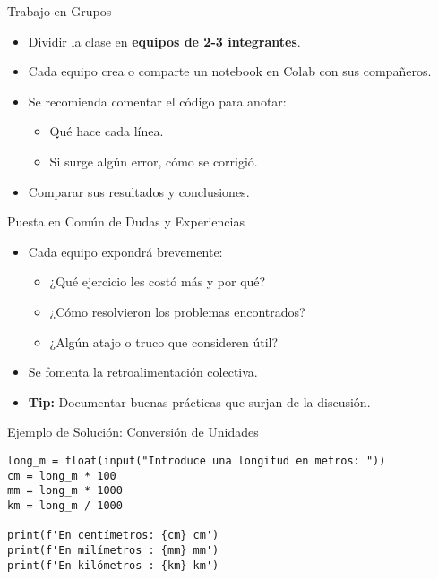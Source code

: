 \documentclass[10pt]{beamer}
\begin{document}
\begin{frame}{Trabajo en Grupos}
  \begin{itemize}
    \item Dividir la clase en \textbf{equipos de 2-3 integrantes}.
    \item Cada equipo crea o comparte un notebook en Colab con sus compañeros.
    \item Se recomienda comentar el código para anotar:
      \begin{itemize}
        \item Qué hace cada línea.
        \item Si surge algún error, cómo se corrigió.
      \end{itemize}
    \item Comparar sus resultados y conclusiones.
  \end{itemize}
\end{frame}

\begin{frame}{Puesta en Común de Dudas y Experiencias}
  \begin{itemize}
    \item Cada equipo expondrá brevemente:
      \begin{itemize}
        \item ¿Qué ejercicio les costó más y por qué?
        \item ¿Cómo resolvieron los problemas encontrados?
        \item ¿Algún atajo o truco que consideren útil?
      \end{itemize}
    \item Se fomenta la retroalimentación colectiva.
    \item \textbf{Tip:} Documentar buenas prácticas que surjan de la discusión.
  \end{itemize}
\end{frame}

\begin{frame}[fragile]{Ejemplo de Solución: Conversión de Unidades}
\begin{verbatim}
long_m = float(input("Introduce una longitud en metros: "))
cm = long_m * 100
mm = long_m * 1000
km = long_m / 1000

print(f'En centímetros: {cm} cm')
print(f'En milímetros : {mm} mm')
print(f'En kilómetros : {km} km')
\end{verbatim}
\end{frame}
\end{document}
